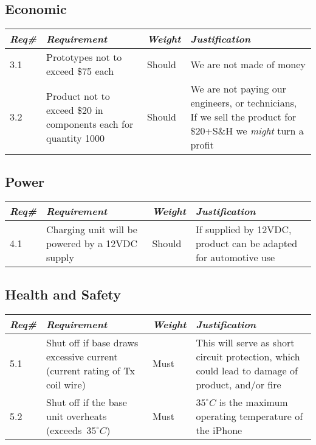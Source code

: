     \subsection{Economic}
        \begin{centering}
        \begin{tabular}{|l|m{7cm}|l|m{7cm}|} \hline
        \textit{\textbf{Req\#}}	& \textit{\textbf{Requirement}} &\textit{\textbf{Weight}}&\textit{\textbf{Justification}} \\ \hline
        3.1 & Prototypes not to exceed \$75 each & Should & We are not made of money  \\ \hline
        3.2 & Product not to exceed \$20 in components each for quantity 1000 & Should & We are not paying our engineers, or technicians, If we sell the product for \$20+S\&H we \textit{might} turn a profit \\ \hline
        \end{tabular}
        \end{centering}    
  
    \subsection{Power }
        \begin{centering}
        \begin{tabular}{|l|m{7cm}|l|m{7cm}|} \hline
        \textit{\textbf{Req\#}}	& \textit{\textbf{Requirement}} &\textit{\textbf{Weight}}&\textit{\textbf{Justification}} \\ \hline
        4.1	& Charging unit will be powered by a 12VDC supply &	Should & If supplied by 12VDC, product can be adapted for automotive use \\ \hline
        \end{tabular}
        \end{centering}

    \subsection{Health and Safety }
        \begin{centering}
        \begin{tabular}{|l|m{7cm}|l|m{7cm}|} \hline
        \textit{\textbf{Req\#}}	& \textit{\textbf{Requirement}} &\textit{\textbf{Weight}}&\textit{\textbf{Justification}} \\ \hline
        5.1	& Shut off if base draws excessive current (current rating of Tx coil wire)	& Must &This will serve as short circuit protection, which could lead to damage of product, and/or fire \\ \hline
        5.2	& Shut off if the base unit overheats \mbox{(exceeds $35^{\circ}C$)}  & Must & $35^{\circ}C$ is the maximum operating temperature of the iPhone \cite{appletemp} \\ \hline
        \end{tabular}
        \end{centering}

